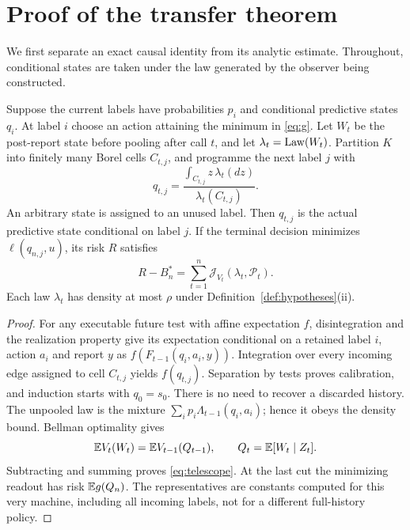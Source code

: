 \section{Proof of the transfer theorem}\label{sec:proof}
We first separate an exact causal identity from its analytic estimate. Throughout, conditional states are taken under the law generated by the observer being constructed.

\begin{lemma}\label{lem:telescope}
Suppose the current labels have probabilities $p_i$ and conditional predictive states $q_i$. At label $i$ choose an action attaining the minimum in \eqref{eq:g}. Let $W_t$ be the post-report state before pooling after call $t$, and let $\lambda_t=\operatorname{Law}(W_t)$. Partition $K$ into finitely many Borel cells $C_{t,j}$, and programme the next label $j$ with
\[
 q_{t,j}=\frac{\int_{C_{t,j}}z\,\lambda_t(dz)}{\lambda_t(C_{t,j})}.
\]
An arbitrary state is assigned to an unused label. Then $q_{t,j}$ is the actual predictive state conditional on label $j$. If the terminal decision minimizes $\ell(q_{n,j},u)$, its risk $R$ satisfies
\begin{equation}\label{eq:telescope}
 R-B_n^*=\sum_{t=1}^n\mathcal J_{V_t}(\lambda_t,\mathcal P_t).
\end{equation}
Each law $\lambda_t$ has density at most $\rho$ under Definition~\ref{def:hypotheses}(ii).
\end{lemma}
\begin{proof}
For any executable future test with affine expectation $f$, disintegration and the realization property give its expectation conditional on a retained label $i$, action $a_i$ and report $y$ as $f(F_{t-1}(q_i,a_i,y))$. Integration over every incoming edge assigned to cell $C_{t,j}$ yields $f(q_{t,j})$. Separation by tests proves calibration, and induction starts with $q_0=s_0$. There is no need to recover a discarded history. The unpooled law is the mixture $\sum_i p_i\Lambda_{t-1}(q_i,a_i)$; hence it obeys the density bound. Bellman optimality gives
\[
 \mathbb E V_t(W_t)=\mathbb E V_{t-1}(Q_{t-1}),\qquad
 Q_t=\mathbb E[W_t\mid Z_t].
\]
Subtracting and summing proves \eqref{eq:telescope}. At the last cut the minimizing readout has risk $\mathbb E g(Q_n)$. The representatives are constants computed for this very machine, including all incoming labels, not for a different full-history policy.
\end{proof}

